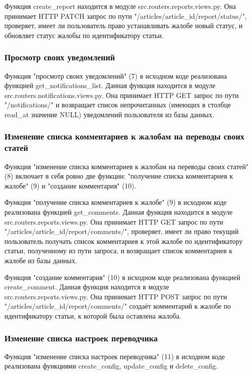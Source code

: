 \documentclass[14pt]{extarticle}
\begin{document}
Функция create\_report находится в модуле src.routers.reports.views.py. Она принимает HTTP PATCH запрос по пути "/articles/{article\_id}/report/status/", проверяет, имеет ли пользователь право устанавливать жалобе новый статус, и обновляет статус жалобы по идентификатору статьи.

\subsubsection{Просмотр своих уведомлений}

Функция "просмотр своих уведомлений" (7) в исходном коде реализована функцией get\_notifications\_list. Данная функция находится в модуле src.routers.notifications.views.py. Она принимает HTTP GET запрос по пути "/notifications/" и возвращает список непрочитанных (имеющих в столбце read\_at значение NULL) уведомлений пользователя из базы данных.

\subsubsection{Изменение списка комментариев к жалобам на переводы своих статей}

Функция "изменение списка комментариев к жалобам на переводы своих статей" (8) включает в себя ровно две функции: "получение списка комментариев к жалобе" (9) и "создание комментария" (10).

Функция "получение списка комментариев к жалобе" (9) в исходном коде реализована функцией get\_comments. Данная функция находится в модуле src.routers.reports.views.py. Она принимает HTTP GET запрос по пути "/articles/{article\_id}/report/comments/", проверяет, имеет ли право текущий пользователь получать список комментариев к этой жалобе по идентификатору статьи, полученному из пути запроса, и возвращает список комментариев к жалобе из базы данных.

Функция "создание комментария" (10) в исходном коде реализована функцией create\_comment. Данная функция находится в модуле src.routers.reports.views.py. Она принимает HTTP POST запрос по пути "/articles/{article\_id}/report/comments/" создаёт комментарий к жалобе по идентификатору статьи, к которой была оставлена жалоба.

\subsubsection{Изменение списка настроек переводчика}

Функция "изменение списка настроек переводчика" (11) в исходном коде реализована функциями create\_config, update\_config и delete\_config.
\end{document}
